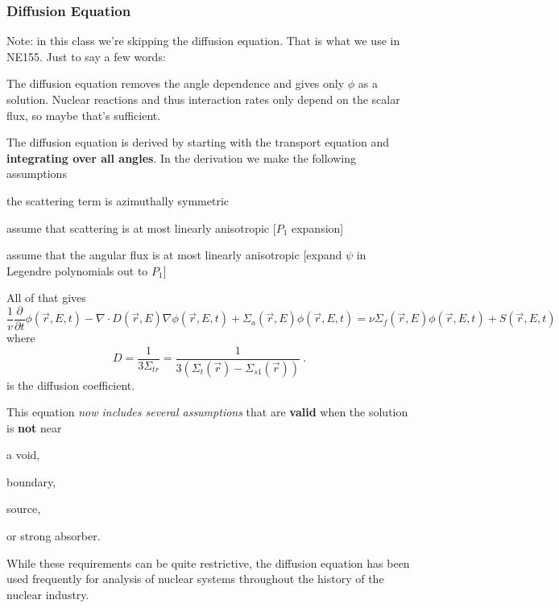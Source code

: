 \documentclass[12pt]{article}
\newcommand{\Macro}{\ensuremath{\Sigma}}
\begin{document}
\subsubsection*{Diffusion Equation}
Note: in this class we're skipping the diffusion equation. That is what we use in NE155. Just to say a few words:

The diffusion equation removes the angle dependence and gives only $\phi$ as a solution. Nuclear reactions and thus interaction rates only depend on the scalar flux, so maybe that's sufficient.

The diffusion equation is derived by starting with the transport equation and \textbf{integrating over all angles}. In the derivation we make the following assumptions
\begin{compactitem}
\item the scattering term is azimuthally symmetric
\item assume that scattering is at most linearly anisotropic [$P_1$ expansion]
\item assume that the angular flux is at most linearly anisotropic [expand $\psi$ in Legendre polynomials out to $P_1$]
\end{compactitem} 
All of that gives
\begin{equation}
\boxed{\frac{1}{v}\frac{\partial}{\partial t}\phi(\vec{r}, E, t) 
-\nabla \cdot D(\vec{r}, E)\nabla \phi(\vec{r}, E, t) + 
\Sigma_a(\vec{r},E) \phi(\vec{r}, E, t) =
\nu \Sigma_f(\vec{r},E) \phi(\vec{r}, E, t) +
S(\vec{r}, E, t)} \nonumber
\end{equation}
where
\[D = \frac{1}{3\Macro_{tr}} = \frac{1}{3(\Macro_t(\vec{r}) - \Macro_{s1}(\vec{r}))}\:.\] 
is the diffusion coefficient. 

This equation \textit{now includes several assumptions} that are \textbf{valid} when the solution is \textbf{not} near
%
\begin{compactitem}
\item a void, 
\item boundary, 
\item source, 
\item or strong absorber.
\end{compactitem} 
%
While these requirements can be quite restrictive, the diffusion equation has been used frequently for analysis of nuclear systems throughout the history of the nuclear industry.
\end{document}
